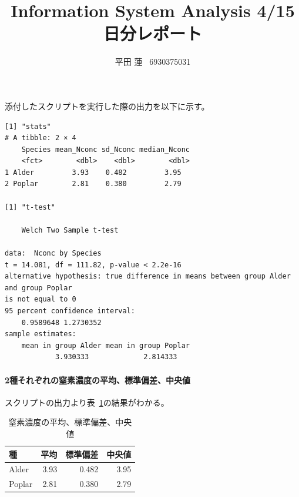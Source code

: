 \documentclass{jsarticle}
\title{Information System Analysis 4/15日分レポート}
\author{平田 蓮 \ 6930375031}
\begin{document}
\maketitle

添付したスクリプトを実行した際の出力を以下に示す。

\begin{verbatim}
[1] "stats"
# A tibble: 2 × 4
    Species mean_Nconc sd_Nconc median_Nconc
    <fct>        <dbl>    <dbl>        <dbl>
1 Alder         3.93    0.482         3.95
2 Poplar        2.81    0.380         2.79

[1] "t-test"

    Welch Two Sample t-test

data:  Nconc by Species
t = 14.081, df = 111.82, p-value < 2.2e-16
alternative hypothesis: true difference in means between group Alder and group Poplar 
is not equal to 0
95 percent confidence interval:
    0.9589648 1.2730352
sample estimates:
    mean in group Alder mean in group Poplar 
            3.930333             2.814333 
\end{verbatim}

\paragraph{2種それぞれの窒素濃度の平均、標準偏差、中央値}
    スクリプトの出力より表~\ref{tab:stats}の結果がわかる。

    \begin{table}
        \centering
        \caption{窒素濃度の平均、標準偏差、中央値}
        \label{tab:stats}
        \begin{tabular}{l|rrr} \hline
            種 & 平均 & 標準偏差 & 中央値 \\ \hline\hline
            Alder & 3.93 & 0.482 & 3.95 \\
            Poplar & 2.81 & 0.380 & 2.79 \\ \hline
        \end{tabular}
    \end{table}
\end{document}
